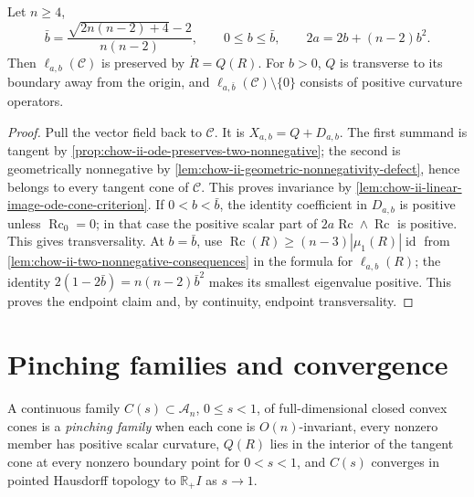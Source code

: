 \begin{proposition}
  \label{prop:chow-ii-preserved-stretched-two-nonnegative-cones}
  Let \(n\ge4\),
  \[
  \bar b=\frac{\sqrt{2n(n-2)+4}-2}{n(n-2)},\qquad
  0\le b\le\bar b,\qquad 2a=2b+(n-2)b^2.
  \]
  Then \(\ell_{a,b}(\mathcal C)\) is preserved by \(\dot R=Q(R)\).  For
  \(b>0\), \(Q\) is transverse to its boundary away from the origin, and
  \(\ell_{a,\bar b}(\mathcal C)\setminus\{0\}\) consists of positive
  curvature operators.
\end{proposition}
\begin{proof}
\sketch
  Pull the vector field back to \(\mathcal C\).  It is
  \(X_{a,b}=Q+D_{a,b}\).  The first summand is tangent by
  \ref{prop:chow-ii-ode-preserves-two-nonnegative}; the second is
  geometrically nonnegative by
  \ref{lem:chow-ii-geometric-nonnegativity-defect}, hence belongs to every
  tangent cone of \(\mathcal C\).  This proves invariance by
  \ref{lem:chow-ii-linear-image-ode-cone-criterion}.  If \(0<b<\bar b\),
  the identity coefficient in \(D_{a,b}\) is positive unless
  \(\operatorname{Rc}_0=0\); in that case the positive scalar part of
  \(2a\operatorname{Rc}\wedge\operatorname{Rc}\) is positive.  This gives
  transversality.  At \(b=\bar b\), use
  \(\operatorname{Rc}(R)\ge(n-3)|\mu_1(R)|\operatorname{id}\) from
  \ref{lem:chow-ii-two-nonnegative-consequences} in the formula for
  \(\ell_{a,b}(R)\); the identity
  \(2(1-2\bar b)=n(n-2)\bar b^2\) makes its smallest eigenvalue positive.
  This proves the endpoint claim and, by continuity, endpoint transversality.
\end{proof}

\section{Pinching families and convergence}

\begin{definition}
  \label{def:chow-ii-pinching-family}
  A continuous family \(C(s)\subset\mathcal A_n\), \(0\le s<1\), of
  full-dimensional closed convex cones is a \emph{pinching family} when each
  cone is \(O(n)\)-invariant, every nonzero member has positive scalar
  curvature, \(Q(R)\) lies in the interior of the tangent cone at every
  nonzero boundary point for \(0<s<1\), and \(C(s)\) converges in pointed
  Hausdorff topology to \(\mathbb R_+I\) as \(s\to1\).
\end{definition}

